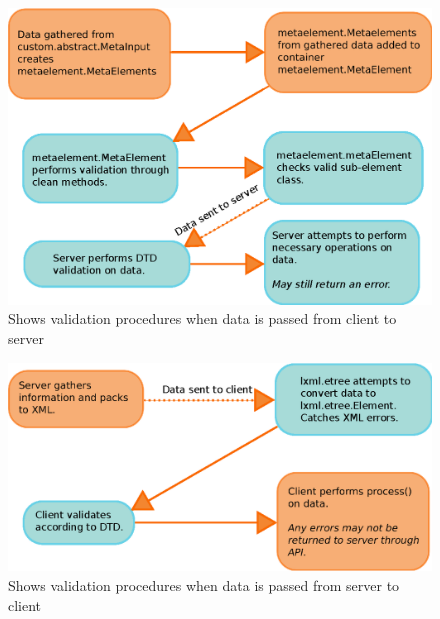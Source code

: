 \begin{figure}[h!]
    \includegraphics[width=\textwidth]{img/site_information_flow}
    \caption{Shows validation procedures when data is passed from client to
    server}
    \label{fig:site_information_flow}
\end{figure}

\begin{figure}[h!]
    \includegraphics[width=\textwidth]{img/server_information_flow}
    \caption{Shows validation procedures when data is passed from server to
    client}
    \label{fig:server_information_flow}
\end{figure}

